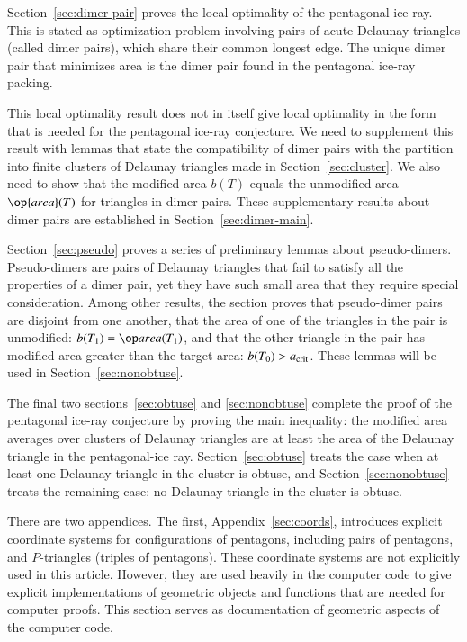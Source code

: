 Section~\ref{sec:dimer-pair} proves the local optimality of the
pentagonal ice-ray.  This is stated as optimization problem involving
pairs of acute Delaunay triangles (called dimer pairs), which share
their common longest edge.  The unique dimer pair that minimizes area
is the dimer pair found in the pentagonal ice-ray packing.

This local optimality result does not in itself give local optimality
in the form that is needed for the pentagonal ice-ray conjecture.  We
need to supplement this result with lemmas that state the
compatibility of dimer pairs with the partition into finite clusters
of Delaunay triangles made in Section~\ref{sec:cluster}.  We also need
to show that the modified area $b(T)$ equals the unmodified area
$\op{area}(T)$ for triangles in dimer pairs.  These supplementary
results about dimer pairs are established in
Section~\ref{sec:dimer-main}.

Section~\ref{sec:pseudo} proves a series of preliminary lemmas about
pseudo-dimers.  Pseudo-dimers are pairs of Delaunay triangles that
fail to satisfy all the properties of a dimer pair, yet they have such
small area that they require special consideration.  Among other
results, the section proves that pseudo-dimer pairs are disjoint from
one another, that the area of one of the triangles in the pair is
unmodified: $b(T_1)=\area(T_1)$, and that the other triangle in the
pair has modified area greater than the target area: $b(T_0)>a_\text{crit}$.
These lemmas will be used in Section~\ref{sec:nonobtuse}.

The final two sections~\ref{sec:obtuse} and \ref{sec:nonobtuse}
complete the proof of the pentagonal ice-ray conjecture by proving the
main inequality: the modified area averages over clusters of Delaunay
triangles are at least the area of the Delaunay triangle in the
pentagonal-ice ray.  Section~\ref{sec:obtuse} treats the case when at
least one Delaunay triangle in the cluster is obtuse, and
Section~\ref{sec:nonobtuse} treats the remaining case: no Delaunay
triangle in the cluster is obtuse.

There are two appendices.  The first, Appendix~\ref{sec:coords},
introduces explicit coordinate systems for configurations of
pentagons, including pairs of pentagons, and $P$-triangles (triples of
pentagons).  These coordinate systems are not explicitly used in this
article.  However, they are used heavily in the computer code to give
explicit implementations of geometric objects and functions that are
needed for computer proofs.  This section serves as
documentation of geometric aspects of the computer code.

